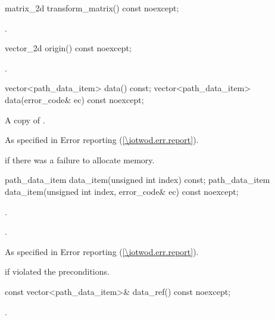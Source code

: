 \begin{itemdecl}
    matrix_2d transform_matrix() const noexcept;
\end{itemdecl}
\begin{itemdescr}
	\pnum
	\returns
	.

\end{itemdescr}

\begin{itemdecl}
    vector_2d origin() const noexcept;
\end{itemdecl}
\begin{itemdescr}
	\pnum
	\returns
	.

\end{itemdescr}

\begin{itemdecl}
    vector<path_data_item> data() const;
    vector<path_data_item> data(error_code& ec) const noexcept;
\end{itemdecl}
\begin{itemdescr}
	\pnum
	\returns
	A copy of .

	\pnum
	\throws
	As specified in Error reporting (\ref{\iotwod.err.report}).

	\pnum
	\errors
	 if there was a failure to allocate memory.
	
\end{itemdescr}

\begin{itemdecl}
    path_data_item data_item(unsigned int index) const;
    path_data_item data_item(unsigned int index, error_code& ec) const noexcept;
\end{itemdecl}
\begin{itemdescr}
	\pnum
	\preconditions
	.
	
	\pnum
	\returns
	.
	
	\pnum
	\throws
	As specified in Error reporting (\ref{\iotwod.err.report}).

	\pnum
	\errors
	 if  violated the preconditions.

\end{itemdescr}

\begin{itemdecl}
    const vector<path_data_item>& data_ref() const noexcept;
\end{itemdecl}
\begin{itemdescr}
	\pnum
	\returns
	.

\end{itemdescr}
